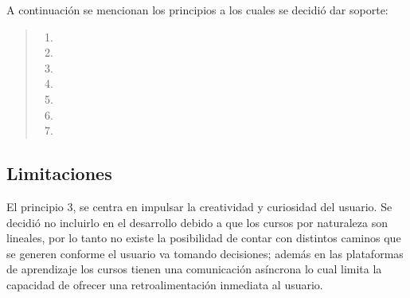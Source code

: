     A continuación se mencionan los principios a los cuales se decidió dar soporte:
     
        \begin{quote}
        \begin{enumerate}
            \item \principioI
            \item \principioII
            \setcounter{enumi}{3}
            \item \principioIV
            \item \principioV
            \item \principioVI
            \item \principioVII
            \item \principioVIII
        \end{enumerate}
        \end{quote}

\subsection{Limitaciones}
\label{subsec:limitaciones}

     
     \noindent El principio 3, \principioIII se centra en impulsar la creatividad y curiosidad del usuario. Se decidió no incluirlo en el desarrollo debido a que los cursos por naturaleza son lineales, por lo tanto no existe la posibilidad de contar con distintos caminos que se generen conforme el usuario va tomando decisiones; además en las plataformas de aprendizaje los cursos tienen una comunicación asíncrona lo cual limita la capacidad de ofrecer una retroalimentación inmediata al usuario. %
